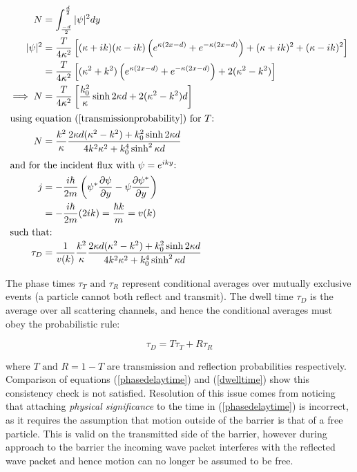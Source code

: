 \documentclass{article}
\begin{document}
\begin{align}
	N&=\int_{\frac{-d}{2}}^{\frac{d}{2}}|\psi|^2dy \\
	|\psi|^2 &= \frac{T}{4\kappa^2}\left[(\kappa+ik)(\kappa-ik)\left(e^{\kappa(2x-d)}+e^{-\kappa(2x-d)}\right)+(\kappa+ik)^2+(\kappa-ik)^2\right] \\
		 &= \frac{T}{4\kappa^2}\left[(\kappa^2+k^2)\left(e^{\kappa(2x-d)}+e^{-\kappa(2x-d)}\right)+2(\kappa^2-k^2)\right] \\
	\implies N &= \frac{T}{4\kappa^2}\left[\frac{k_0^2}{\kappa}\sinh{2\kappa d}+2(\kappa^2-k^2)d\right] \\ \intertext{using equation (\ref{transmissionprobability}) for $T$:}
		 N &= \frac{k^2}{\kappa}\frac{2\kappa d(\kappa^2-k^2)+k_0^2\sinh{2\kappa d}}{4k^2\kappa^2+k_0^4\sinh^2{\kappa d}}\\ \intertext{and for the incident flux with $\psi = e^{iky}$:
}
	j &= -\frac{i\hbar}{2m}\left(\psi^{*}\frac{\partial\psi}{\partial y}-\psi \frac{\partial \psi^{*}}{\partial y}\right) \\ 
	  &= -\frac{i\hbar}{2m}(2ik) = \frac{\hbar k}{m} = v(k) \\ \intertext{such that:}
	\tau_D &= \frac{1}{v(k)}\frac{k^2}{\kappa}\frac{2\kappa d(\kappa^2-k^2)+k_0^2\sinh{2\kappa d}}{4k^2\kappa^2+k_0^4\sinh^2{\kappa d}}
	\label{dwelltime}
\end{align}

\noindent The phase times $\tau_T \text{ and } \tau_R$ represent conditional averages over mutually exclusive events (a particle cannot both reflect and transmit). The dwell time $\tau_D$ is the average over all scattering channels, and hence the conditional averages must obey the probabilistic rule:

\begin{equation}
	\tau_D = T\tau_T+R\tau_R
\end{equation}

\noindent where $T \text{ and } R = 1-T$ are transmission and reflection probabilities respectively. Comparison of equations (\ref{phasedelaytime}) and (\ref{dwelltime}) show this consistency check is not satisfied. Resolution of this issue comes from noticing that attaching \textit{physical significance} to the time in (\ref{phasedelaytime}) is incorrect, as it requires the assumption that motion outside of the barrier is that of a free particle. This is valid on the transmitted side of the barrier, however during approach to the barrier the incoming wave packet interferes with the reflected wave packet and hence motion can no longer be assumed to be free.
\end{document}
